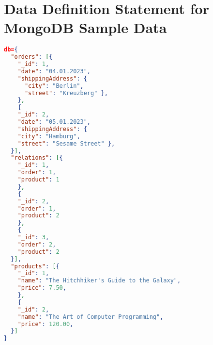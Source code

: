 \section{Data Definition Statement for MongoDB Sample Data} \label{apx:Data Definition Statement for MongoDB Sample Data}
\begin{lstlisting}[language=JSON, caption=JSON, captionpos=b, label=lst:DDLStatements]
db={
  "orders": [{
    "_id": 1,
    "date": "04.01.2023",
    "shippingAddress": {
      "city": "Berlin",
      "street": "Kreuzberg" },
    },
    {
    "_id": 2,
    "date": "05.01.2023",
    "shippingAddress": {
    "city": "Hamburg",
    "street": "Sesame Street" },
  }],
  "relations": [{
    "_id": 1,
    "order": 1,
    "product": 1
    },
	{
    "_id": 2,
    "order": 1,
    "product": 2
    },
    {
    "_id": 3,
    "order": 2,
    "product": 2
  }],
  "products": [{
    "_id": 1,
    "name": "The Hitchhiker's Guide to the Galaxy",
    "price": 7.50,
    },
    {
    "_id": 2,
    "name": "The Art of Computer Programming",
    "price": 120.00,	
  }]
}
\end{lstlisting}

